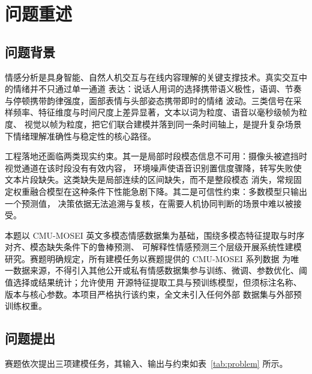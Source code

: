 \documentclass[bwprint]{gmcmthesis}
\begin{document}
\pagestyle{plain}

\maketoc
\clearpage


\section{问题重述}

\subsection{问题背景}

情感分析是具身智能、自然人机交互与在线内容理解的关键支撑技术。真实交互中的情绪并不只通过单一通道
表达：说话人用词的选择携带语义极性，语调、节奏与停顿携带韵律强度，面部表情与头部姿态携带即时的情绪
波动。三类信号在采样频率、特征维度与时间尺度上差异显著，文本以词为粒度、语音以毫秒级帧为粒度、
视觉以帧为粒度，把它们联合建模并落到同一条时间轴上，是提升复杂场景下情绪理解准确性与稳定性的核心路径。

工程落地还面临两类现实约束。其一是局部时段模态信息不可用：摄像头被遮挡时视觉通道在该时段没有有效内容，
环境噪声使语音识别置信度骤降，转写失败使文本片段缺失。这类缺失是局部连续的区间缺失，而不是整段模态
消失，常规固定权重融合模型在这种条件下性能急剧下降。其二是可信性约束：多数模型只输出一个预测值，
决策依据无法追溯与复核，在需要人机协同判断的场景中难以被接受。

本题以 CMU-MOSEI 英文多模态情感数据集为基础，围绕多模态特征提取与时序对齐、模态缺失条件下的鲁棒预测、
可解释性情感预测三个层级开展系统性建模研究。赛题明确规定，所有建模任务以赛题提供的 CMU-MOSEI 系列数据
为唯一数据来源，不得引入其他公开或私有情感数据集参与训练、微调、参数优化、阈值选择或结果统计；允许使用
开源特征提取工具与预训练模型，但须标注名称、版本与核心参数。本项目严格执行该约束，全文未引入任何外部
数据集与外部预训练权重。

\subsection{问题提出}

赛题依次提出三项建模任务，其输入、输出与约束如表~\ref{tab:problem} 所示。
\end{document}
